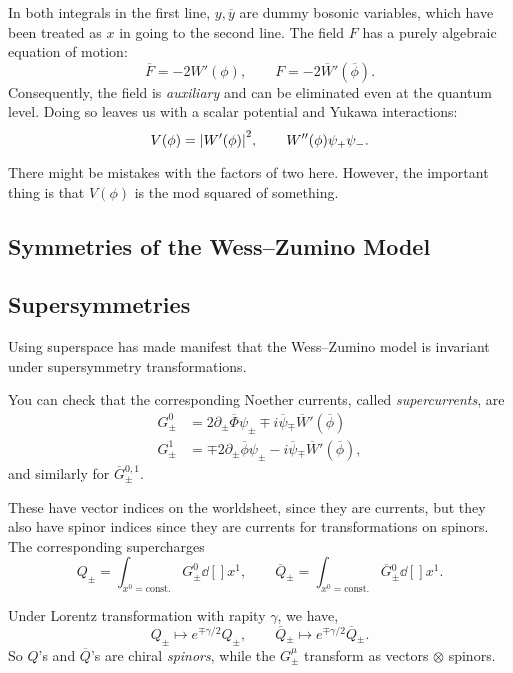 In both integrals in the first line, $y, \overline{y}{}$ are dummy bosonic variables, which have been treated as $x$ in going to the second line.
The field $F$ has a purely algebraic equation of motion:
\begin{equation}
  \overline{F}{} = -2 W'(\phi), \qquad F = -2 \overline{W}{}'(\overline{\phi}{}).
\end{equation}
Consequently, the field is \emph{auxiliary} and can be eliminated even at the quantum level. Doing so leaves us with a scalar potential and Yukawa interactions:
\begin{equation}
  V(\phi) = \abs{W'(\phi)}^2, \qquad W''(\phi) \psi_+ \psi_-.
\end{equation}
\begin{remark}
  There might be mistakes with the factors of two here. However, the important thing is that $V(\phi)$ is the mod squared of something.
\end{remark}

\subsection{Symmetries of the Wess--Zumino Model}%
\label{sub:symmetries_of_the_wess_zumino_model}

\subsection*{Supersymmetries}%

Using superspace has made manifest that the Wess--Zumino model is invariant under supersymmetry transformations.
\begin{exercise}
  You can check that the corresponding Noether currents, called \emph{supercurrents}, are
  \begin{align}
    G_{\pm}^0 &= 2 \partial_{\pm} \overline{\Phi}{} \psi_{\pm} \mp i \overline{\psi}{}_{\mp} \overline{W}{}'(\overline{\phi}{})  \\
    G_{\pm}^1 &= \mp 2 \partial_{\pm} \overline{\phi}{} \psi_{\pm} - i \overline{\psi}{}_{\mp} \overline{W}{}'(\overline{\phi}{}),
  \end{align}
  and similarly for $\overline{G}{}^{0, 1}_{\pm}$.
\end{exercise}
These have vector indices on the worldsheet, since they are currents, but they also have spinor indices since they are currents for transformations on spinors.
The corresponding supercharges
\begin{equation}
  Q_{\pm} = \int_{x^0 = \text{const.}} G^0 _{\pm} \dd[]{x^1}, \qquad
  \overline{Q}{}_{\pm} = \int_{x^0 = \text{const.}} \overline{G}{}^0 _{\pm} \dd[]{x^1}.
\end{equation}
\begin{remark}
  Under Lorentz transformation with rapity $\gamma$, we have, 
  \begin{equation}
    Q_{\pm} \mapsto e^{\mp \gamma / 2} Q_{\pm}, \qquad 
    \overline{Q}{}_{\pm} \mapsto e^{\mp \gamma / 2} \overline{Q}{}_{\pm}.
  \end{equation}
  So $Q$'s and $\overline{Q}{}$'s are chiral \emph{spinors}, while the $G^{\mu}_{\pm}$ transform as vectors $\otimes$ spinors.
\end{remark}

